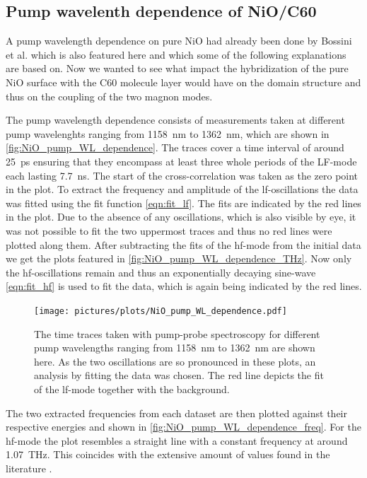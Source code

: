 \subsection{Pump wavelenth dependence of NiO/C60}
A pump wavelength dependence on pure NiO had already been done by Bossini et al.  which is also featured here and which some of the following explanations are based on.
Now we wanted to see what impact the hybridization of the pure NiO surface with the C60 molecule layer would have on the domain structure and thus on the coupling of the two magnon modes.

The pump wavelength dependence consists of measurements taken at different pump wavelenghts ranging from \qty{1158}{nm} to \qty{1362}{nm}, which are shown in \autoref{fig:NiO_pump_WL_dependence}.
The traces cover a time interval of around \qty{25}{ps} ensuring that they encompass at least three whole periods of the LF-mode each lasting \qty{7.7}{ns}.
The start of the cross-correlation was taken as the zero point in the plot.
To extract the frequency and amplitude of the lf-oscillations the data was fitted using the fit function \autoref{eqn:fit_lf}.
The fits are indicated by the red lines in the plot. 
Due to the absence of any oscillations, which is also visible by eye, it was not possible to fit the two uppermost traces and thus no red lines were plotted along them.
After subtracting the fits of the hf-mode from the initial data we get the plots featured in \autoref{fig:NiO_pump_WL_dependence_THz}.
Now only the hf-oscillations remain and thus an exponentially decaying sine-wave \autoref{eqn:fit_hf} is used to fit the data, which is again being indicated by the red lines.
\begin{figure}[ht]
    \centering
    \texttt{[image: pictures/plots/NiO\_pump\_WL\_dependence.pdf]}
    \caption{The time traces taken with pump-probe spectroscopy for different pump wavelengths ranging from \qty{1158}{nm} to \qty{1362}{nm} are shown here. As the two oscillations are so pronounced in these plots, an analysis by fitting the data was chosen. The red line depicts the fit of the lf-mode together with the background.}
    \label{fig:NiO_pump_WL_dependence}
\end{figure}
\FloatBarrier
The two extracted frequencies from each dataset are then plotted against their respective energies and shown in \autoref{fig:NiO_pump_WL_dependence_freq}.
For the hf-mode the plot resembles a straight line with a constant frequency at around \qty{1.07}{THz}.
This coincides with the extensive amount of values found in the literature .
